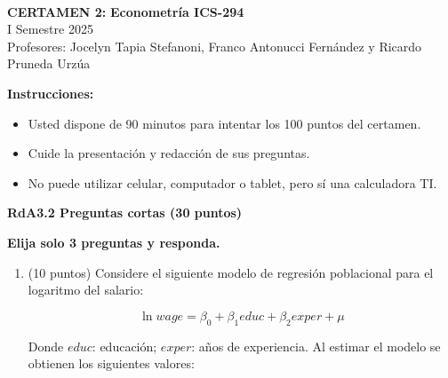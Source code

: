 \documentclass{article} %
\begin{document}
{\fontsize{30pt}{36pt}\selectfont

\begin{center}
    
\textbf{\\CERTAMEN 2:}
\textbf{Econometría ICS-294}
\\
\vspace{0.2cm}
I Semestre 2025\\
Profesores: Jocelyn Tapia Stefanoni, Franco Antonucci Fernández y Ricardo Pruneda Urz\'ua\\
\end{center}

\textbf{Instrucciones:} 

\begin{itemize}

    \item Usted dispone de 90 minutos  para intentar los 100 puntos del certamen.
    \item Cuide la presentación y redacción de sus preguntas.
    \item No puede utilizar celular, computador o tablet, pero sí una calculadora TI.
     
\end{itemize}
\newpage
{\bf RdA3.2  Preguntas cortas (30 puntos)}

{\bf Elija solo 3 preguntas y responda. }
\begin{enumerate}
   \item   (10 puntos) 
   Considere el siguiente modelo de regresión poblacional para el logaritmo del salario:
    
    $$\ln{wage} = \beta_0 + \beta_1 educ + \beta_2 exper + \mu$$
    
    Donde $educ$: educación; $exper$: años de experiencia. Al estimar el modelo se obtienen los siguientes valores:


\end{enumerate}}
\end{document}
